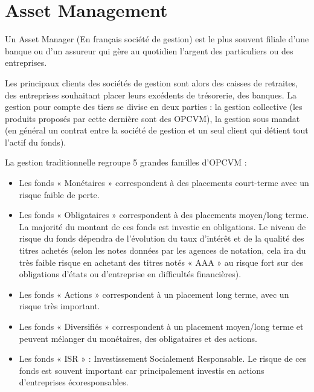 \section{Asset Management}


\par Un Asset Manager (En français société de gestion) est le plus souvent filiale d’une banque ou d’un assureur qui gère au quotidien l’argent des particuliers ou des entreprises. 
\par Les principaux clients des sociétés de gestion sont alors des caisses de retraites, des entreprises souhaitant placer leurs excédents de trésorerie, des banques. La gestion pour compte des tiers se divise en deux parties : la gestion collective (les produits proposés par cette dernière sont des OPCVM), la gestion sous mandat (en général un contrat entre la société de gestion et un seul client qui détient tout l’actif du fonds). 
\par La gestion traditionnelle regroupe 5 grandes familles d’OPCVM :
\begin{itemize}
    \item Les fonds « Monétaires » correspondent à des placements court-terme avec un risque faible de perte.
    \item Les fonds « Obligataires » correspondent à des placements moyen/long terme. La majorité du montant de ces fonds est investie en obligations. Le niveau de risque du fonds dépendra de l’évolution du taux d’intérêt et de la qualité des titres achetés (selon les notes données par les agences de notation, cela ira du très faible risque en achetant des titres notés « AAA » au risque fort sur des obligations d’états ou d’entreprise en difficultés financières).
    \item Les fonds « Actions » correspondent à un placement long terme, avec un risque très important.
    \item Les fonds « Diversifiés » correspondent à un placement moyen/long terme et peuvent mélanger du monétaires, des obligataires et des actions.
    \item Les fonds « ISR » : Investissement Socialement Responsable. Le risque de ces fonds est souvent important car principalement investis en actions d’entreprises écoresponsables.
\end{itemize}

